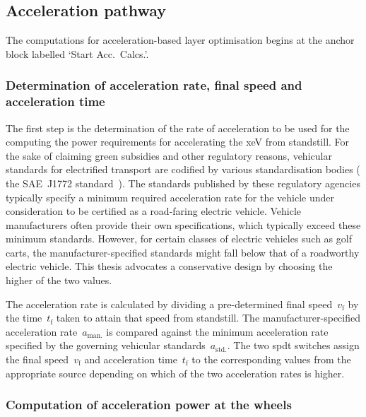 \subsection{Acceleration pathway}

The computations for acceleration-based layer  optimisation begins at the anchor
block labelled `Start Acc.\ Calcs.'.

\subsubsection*{Determination of acceleration rate, final speed and acceleration time}

The first step is  the determination of the rate of acceleration  to be used for
the  computing  the  power  requirements for  accelerating  the  \gls{xeV}  from
standstill.  For the  sake  of  claiming green  subsidies  and other  regulatory
reasons,  vehicular   standards  for  electrified  transport   are  codified  by
various  standardisation bodies  (\eg{} the  SAE~J1772 standard~\cite{Sae2010}).
The  standards  published  by  these regulatory  agencies  typically  specify  a
minimum required  acceleration rate  for the vehicle  under consideration  to be
certified as a road-faring electric vehicle. Vehicle manufacturers often provide
their  own  specifications,  which  typically exceed  these  minimum  standards.
However,  for certain  classes  of electric  vehicles such  as  golf carts,  the
manufacturer-specified standards might fall below  that of a roadworthy electric
vehicle. This thesis  advocates a conservative design by choosing  the higher of
the two values.

The  acceleration  rate  is  calculated   by  dividing  a  pre-determined  final
speed~$v_\text{f}$  by the  time~$t_\text{f}$ taken  to attain  that speed  from
standstill.  The  manufacturer-specified  acceleration  rate~$a_\text{man.}$  is
compared  against  the minimum  acceleration  rate  specified by  the  governing
vehicular  standards~$a_\text{std.}$. The  two  \gls{spdt}  switches assign  the
final speed~$v_\text{f}$ and acceleration time~$t_\text{f}$ to the corresponding
values from  the appropriate source depending  on which of the  two acceleration
rates is higher.

\subsubsection*{Computation of acceleration power at the wheels}

